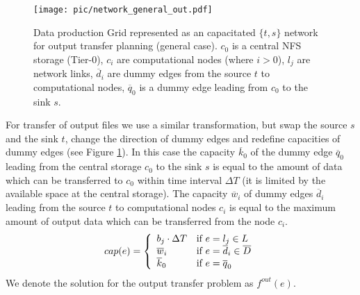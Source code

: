\documentclass{svjour3}                     %
\begin{document}
\label{outproblem}
\begin{figure}[h]
	\begin{center}
		\texttt{[image: pic/network\_general\_out.pdf]}
	\end{center}
	\caption{Data production Grid represented as an capacitated $\{t,s\}$ network for output transfer planning (general case). $c_{0}$ is a central NFS storage (Tier-0), $c_{i}$ are computational nodes (where $i>0$), $l_{j}$ are network links, $\overline{d}_{i}$ are dummy edges from the source $t$ to computational nodes, $\overline{q}_{0}$ is a dummy edge leading from $c_{0}$ to the sink $s$. }
	\label{general_out}	
\end{figure}

For transfer of output files we use a similar transformation, but swap the
source $s$ and the sink $t$, change the direction of dummy edges and redefine
capacities of dummy edges (see Figure \ref{general_out}). In this case the capacity $\overline{k}_{0}$ of the
dummy edge $\overline{q}_{0}$ leading from the central storage $c_0$ to the
sink $s$ is equal to the amount of data which can be transferred to $c_0$
within time interval $\Delta T$ (it is limited by the available space at the
central storage). The capacity $\overline{w}_{i}$ of dummy edges
$\overline{d}_{i}$ leading from the source $t$ to computational nodes $c_{i}$
is equal to the maximum amount of output data which can be transferred from
the node $c_{i}$.
%
\begin{equation}
\label{edge_cap_out}
cap(e) = \left\{ 
  \begin{array}{l l}
    b_{j} \cdot \Delta T & \text{if }e = l_{j} \in L \\
    \overline{w}_{i} & \text{if } e = \overline{d}_{i} \in \overline{D}\\
    \overline{k}_{0} & \text{if } e = \overline{q}_{0}
  \end{array} \right.
\end{equation}
%
We denote the solution for the output transfer problem as $f^{out}(e)$.
\end{document}
